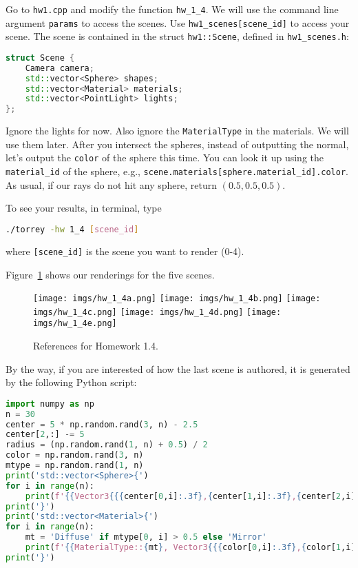 Go to \lstinline{hw1.cpp} and modify the function \lstinline{hw_1_4}. We will use the command line argument \lstinline{params} to access the scenes. Use \lstinline{hw1_scenes[scene_id]} to access your scene. The scene is contained in the struct \lstinline{hw1::Scene}, defined in \lstinline{hw1_scenes.h}:
\begin{lstlisting}[language=C++]
struct Scene {
    Camera camera;
    std::vector<Sphere> shapes;
    std::vector<Material> materials;
    std::vector<PointLight> lights; 
};
\end{lstlisting}
Ignore the lights for now. Also ignore the \lstinline{MaterialType} in the materials. We will use them later.
After you intersect the spheres, instead of outputting the normal, let's output the \lstinline{color} of the sphere this time. You can look it up using the \lstinline{material_id} of the sphere, e.g., \lstinline{scene.materials[sphere.material_id].color}. As usual, if our rays do not hit any sphere, return $(0.5, 0.5, 0.5)$.

To see your results, in terminal, type
\begin{lstlisting}[language=bash]
  ./torrey -hw 1_4 [scene_id]
\end{lstlisting}
where \lstinline{[scene_id]} is the scene you want to render (0-4).

Figure~\ref{fig:hw_1_4} shows our renderings for the five scenes.

\begin{figure}[ht]
    \centering
    \texttt{[image: imgs/hw\_1\_4a.png]}
    \texttt{[image: imgs/hw\_1\_4b.png]}
    \texttt{[image: imgs/hw\_1\_4c.png]}
    \texttt{[image: imgs/hw\_1\_4d.png]}
    \texttt{[image: imgs/hw\_1\_4e.png]}
    \caption{References for Homework 1.4.}
    \label{fig:hw_1_4}
\end{figure}

By the way, if you are interested of how the last scene is authored, it is generated by the following Python script:
\begin{lstlisting}[language=Python]
import numpy as np
n = 30
center = 5 * np.random.rand(3, n) - 2.5
center[2,:] -= 5
radius = (np.random.rand(1, n) + 0.5) / 2
color = np.random.rand(3, n)
mtype = np.random.rand(1, n)
print('std::vector<Sphere>{')
for i in range(n):
    print(f'{{Vector3{{{center[0,i]:.3f},{center[1,i]:.3f},{center[2,i]:.3f}}}, {radius[0, i]:.3f}, {i}}},')
print('}')
print('std::vector<Material>{')
for i in range(n):
    mt = 'Diffuse' if mtype[0, i] > 0.5 else 'Mirror'
    print(f'{{MaterialType::{mt}, Vector3{{{color[0,i]:.3f},{color[1,i]:.3f},{color[2,i]:.3f}}}}},')
print('}')
\end{lstlisting}

